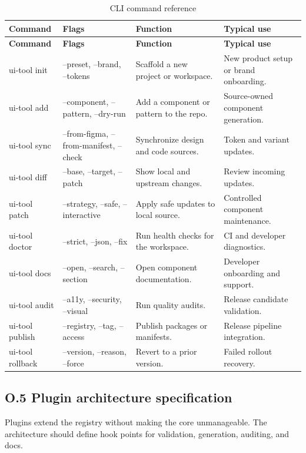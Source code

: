 \begin{longtable}{@{}p{}p{}p{}p{}@{}}
\caption{CLI command reference}\label{tab:cli-reference}\\
\toprule
\textbf{Command} & \textbf{Flags} & \textbf{Function} & \textbf{Typical use} \\
\midrule
\endfirsthead
\toprule
\textbf{Command} & \textbf{Flags} & \textbf{Function} & \textbf{Typical use} \\
\midrule
\endhead
\bottomrule
\endfoot
ui-tool init & --preset, --brand, --tokens & Scaffold a new project or workspace. & New product setup or brand onboarding. \\
ui-tool add & --component, --pattern, --dry-run & Add a component or pattern to the repo. & Source-owned component generation. \\
ui-tool sync & --from-figma, --from-manifest, --check & Synchronize design and code sources. & Token and variant updates. \\
ui-tool diff & --base, --target, --patch & Show local and upstream changes. & Review incoming updates. \\
ui-tool patch & --strategy, --safe, --interactive & Apply safe updates to local source. & Controlled component maintenance. \\
ui-tool doctor & --strict, --json, --fix & Run health checks for the workspace. & CI and developer diagnostics. \\
ui-tool docs & --open, --search, --section & Open component documentation. & Developer onboarding and support. \\
ui-tool audit & --a11y, --security, --visual & Run quality audits. & Release candidate validation. \\
ui-tool publish & --registry, --tag, --access & Publish packages or manifests. & Release pipeline integration. \\
ui-tool rollback & --version, --reason, --force & Revert to a prior version. & Failed rollout recovery. \\
\end{longtable}

\subsection*{O.5 Plugin architecture specification}
Plugins extend the registry without making the core unmanageable. The architecture should define hook points for validation, generation, auditing, and docs.

